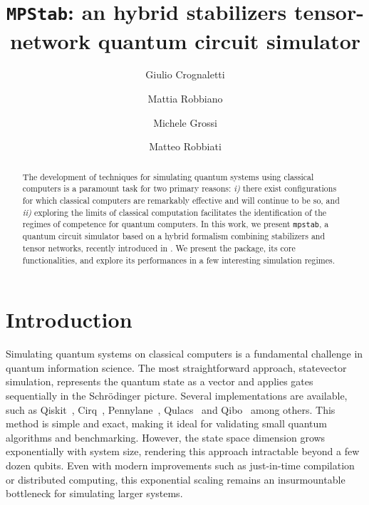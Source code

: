 \documentclass[pra,aps,twocolumn,longbibliography,preprintnumbers,superscriptaddress,nofootnotebib,10pt]{revtex4-2}
\begin{document}
\title{\texttt{MPStab}: an hybrid stabilizers tensor-network quantum circuit simulator}

\author{Giulio Crognaletti}
\author{Mattia Robbiano}
\author{Michele Grossi}
\author{Matteo Robbiati}

\begin{abstract}
The development of techniques for simulating quantum systems using classical computers is 
a paramount task for two primary reasons: \textit{i)} there exist configurations for which 
classical computers are remarkably effective and will continue to be so, and \textit{ii)} 
exploring the limits of classical computation facilitates the identification of the 
regimes of competence for quantum computers. In this work, we present \texttt{mpstab}, 
a quantum circuit simulator based on a hybrid formalism combining stabilizers and 
tensor networks, recently introduced in \cite{Mello_2024}. We present the package, its 
core functionalities, and explore its performances in a few interesting simulation regimes.
\end{abstract}

\maketitle

\tableofcontents

\section{Introduction}

Simulating quantum systems on classical computers is a fundamental challenge in quantum information science. 
The most straightforward approach, statevector simulation, represents the quantum state as a vector and applies 
gates sequentially in the Schrödinger picture. Several implementations are available, such as Qiskit~\cite{qiskit}, Cirq~\cite{cirq}, Pennylane~\cite{pennylane}, Qulacs~\cite{qulacs} and 
Qibo~\cite{Qibo} among others.
This method is simple and exact, making it ideal for validating 
small quantum algorithms and benchmarking. However, the state space dimension grows exponentially with system size, 
rendering this approach intractable beyond a few dozen qubits. Even with modern improvements such as just-in-time 
compilation~\cite{qibojit} or distributed computing, this exponential scaling remains an insurmountable bottleneck for simulating larger systems.
\end{document}
